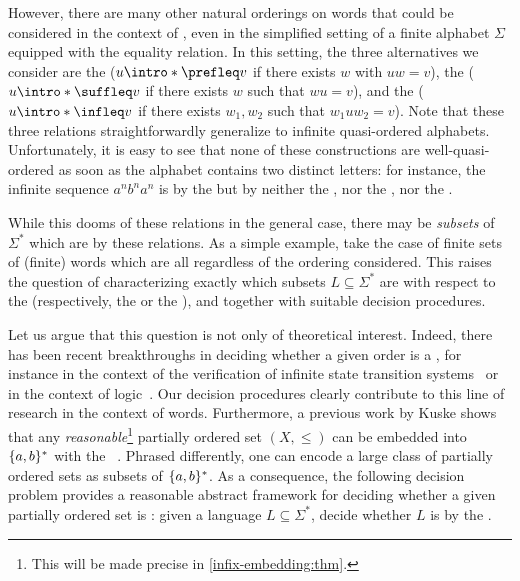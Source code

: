 \AP However, there are many other natural orderings on words that could be
considered in the context of , even in the simplified
setting of a finite alphabet $\Sigma$ equipped with the equality relation. In
this setting, the three alternatives we consider are the  ($u \intro*\prefleq v$ if there exists $w$ with $uw = v$), the
 ($u \intro*\suffleq v$ if there exists $w$ such that
$wu = v$), and the  ($u \intro*\infleq v$ if there exists
$w_1,w_2$ such that $w_1 u w_2 = v$). Note that these three relations
straightforwardly generalize to infinite quasi-ordered alphabets.
Unfortunately, it is easy to see that none of these constructions are 
well-quasi-ordered as soon as the alphabet contains two distinct letters:
for instance, the infinite sequence $a^n b^n a^n$ is  by
the  but by neither the , nor the
, nor the .

\AP While this dooms  of these
relations in the general case, there may be \emph{subsets} of $\Sigma^*$ which
are  by these relations. As a simple example, take the
case of finite sets of (finite) words which are all 
regardless of the ordering considered. This raises the question of
characterizing exactly which subsets $L \subseteq \Sigma^*$ are
 with respect to the  (respectively,
the  or the ), and together with
suitable decision procedures.

\AP Let us argue that this question is not only of theoretical interest.
Indeed, there has been recent breakthroughs in deciding whether a given order
is a , for instance in the context of the verification of
infinite state transition systems~\cite{DBLP:conf/fsttcs/FinkelG19} or in the
context of logic~\cite{DBLP:journals/pacmpl/BergstrasserGLZ24}. Our decision
procedures clearly contribute to this line of research in the context of words.
Furthermore, a previous work by Kuske shows that any
\emph{reasonable}\footnote{ This will be made precise in
\cref{infix-embedding:thm}. } partially ordered set $(X, \leq)$ can
be embedded into $\{ a,b \}^*$ with the ~\cite[Lemma
5.1]{DBLP:journals/ita/Kuske06}. Phrased differently, one can encode a large
class of partially ordered sets as subsets of $\{ a,b \}^*$. As a consequence,
the following decision problem provides a reasonable abstract framework for
deciding whether a given partially ordered set is :
given a language $L \subseteq \Sigma^*$, decide whether $L$ is
 by the .

